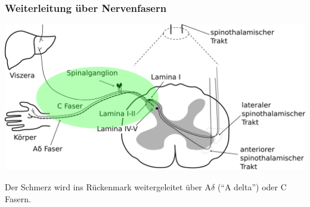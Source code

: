 \documentclass{beamer}
\begin{document}
\begin{frame}
\frametitle{Weiterleitung über Nervenfasern}
 
\begin{center}
\includegraphics[width=\textwidth]{Schmerz_aufsteigend_bis_Rueckenmark_Fasern.png}
\end{center}

Der Schmerz wird ins Rückenmark weitergeleitet über A\(\delta\) (``A delta'') oder C Fasern. 

\end{frame}
\end{document}
